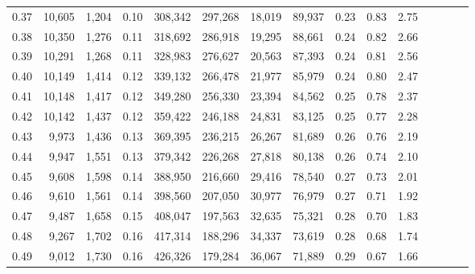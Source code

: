 \begin{tabular}{rrrcrrrrrrrrrrr}
0.37 &  10,605 &  1,204 &                                       0.10 &  308,342 &  297,268 &   18,019 &   89,937 &  0.23 &  0.83 &                         2.75 \\
0.38 &  10,350 &  1,276 &                                       0.11 &  318,692 &  286,918 &   19,295 &   88,661 &  0.24 &  0.82 &                         2.66 \\
0.39 &  10,291 &  1,268 &                                       0.11 &  328,983 &  276,627 &   20,563 &   87,393 &  0.24 &  0.81 &                         2.56 \\
0.40 &  10,149 &  1,414 &                                       0.12 &  339,132 &  266,478 &   21,977 &   85,979 &  0.24 &  0.80 &                         2.47 \\
0.41 &  10,148 &  1,417 &                                       0.12 &  349,280 &  256,330 &   23,394 &   84,562 &  0.25 &  0.78 &                         2.37 \\
0.42 &  10,142 &  1,437 &                                       0.12 &  359,422 &  246,188 &   24,831 &   83,125 &  0.25 &  0.77 &                         2.28 \\
0.43 &   9,973 &  1,436 &                                       0.13 &  369,395 &  236,215 &   26,267 &   81,689 &  0.26 &  0.76 &                         2.19 \\
0.44 &   9,947 &  1,551 &                                       0.13 &  379,342 &  226,268 &   27,818 &   80,138 &  0.26 &  0.74 &                         2.10 \\
0.45 &   9,608 &  1,598 &                                       0.14 &  388,950 &  216,660 &   29,416 &   78,540 &  0.27 &  0.73 &                         2.01 \\
0.46 &   9,610 &  1,561 &                                       0.14 &  398,560 &  207,050 &   30,977 &   76,979 &  0.27 &  0.71 &                         1.92 \\
0.47 &   9,487 &  1,658 &                                       0.15 &  408,047 &  197,563 &   32,635 &   75,321 &  0.28 &  0.70 &                         1.83 \\
0.48 &   9,267 &  1,702 &                                       0.16 &  417,314 &  188,296 &   34,337 &   73,619 &  0.28 &  0.68 &                         1.74 \\
0.49 &   9,012 &  1,730 &                                       0.16 &  426,326 &  179,284 &   36,067 &   71,889 &  0.29 &  0.67 &                         1.66 \\

\end{tabular}
